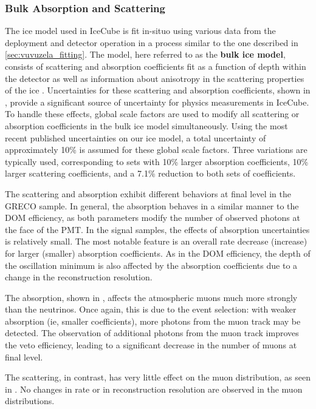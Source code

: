 \subsubsection{Bulk Absorption and Scattering}
\label{subsubsec:bulkice}
The ice model used in IceCube is fit in-situo using various data from the deployment and detector operation in a process similar to the one described in \ref{sec:vuvuzela_fitting}.
The model, here referred to as the \textbf{bulk ice model}, consists of scattering and absorption coefficients fit as a function of depth within the detector as well as information about anisotropy in the scattering properties of the ice .
Uncertainties for these scattering and absorption coefficients, shown in , provide a significant source of uncertainty for physics measurements in IceCube.
To handle these effects, global scale factors are used to modify all scattering or absorption coefficients in the bulk ice model simultaneously.
Using the most recent published uncertainties on our ice model, a total uncertainty of approximately 10\% is assumed for these global scale factors.
Three variations are typically used, corresponding to sets with 10\% larger absorption coefficients, 10\% larger scattering coefficients, and a 7.1\% reduction to both sets of coefficients.

The scattering and absorption exhibit different behaviors at final level in the GRECO sample.
In general, the absorption behaves in a similar manner to the DOM efficiency, as both parameters modify the number of observed photons at the face of the PMT.
In the signal samples, the effects of absorption uncertainties is relatively small.
The most notable feature is an overall rate decrease (increase) for larger (smaller) absorption coefficients.
As in the DOM efficiency, the depth of the oscillation minimum is also affected by the absorption coefficients due to a change in the reconstruction resolution.

The absorption, shown in , affects the atmospheric muons much more strongly than the neutrinos.
Once again, this is due to the event selection: with weaker absorption (ie, smaller coefficients), more photons from the muon track may be detected.
The observation of additional photons from the muon track improves the veto efficiency, leading to a significant decrease in the number of muons at final level.

The scattering, in contrast, has very little effect on the muon distribution, as seen in .
No changes in rate or in reconstruction resolution are observed in the muon distributions.


